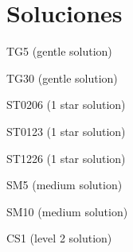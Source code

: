 \documentclass[10pt,letterpaper]{article}
\author{Germ\'{a}n Avendaño Ram\'{i}rez}
\begin{document}
\cluefont{\normalsize}
\section*{Soluciones}

\noindent\begin{minipage}{0.47\linewidth}\begin{center}
TG5 (gentle solution) \\
\end{center}\end{minipage}\hfill
\begin{minipage}{0.47\linewidth}\begin{center}
TG30 (gentle solution) \\
\end{center}\end{minipage}
\vspace*{12pt}

\begin{minipage}{0.47\linewidth}\begin{center}
ST0206 (1 star solution) \\
\end{center}\end{minipage}\hfill
\noindent\begin{minipage}{0.47\linewidth}\begin{center}
ST0123 (1 star solution) \\
\end{center}\end{minipage}
\vspace*{12pt}

\begin{minipage}{0.47\linewidth}\begin{center}
ST1226 (1 star solution) \\
\end{center}\end{minipage}\hfill
\noindent\begin{minipage}{0.47\linewidth}\begin{center}
SM5 (medium solution) \\
\end{center}\end{minipage}
\vspace*{12pt}

\begin{minipage}{0.47\linewidth}\begin{center}
SM10 (medium solution) \\
\end{center}\end{minipage}\hfill
\begin{minipage}{0.47\linewidth}\begin{center}
CS1 (level 2 solution) \\
\end{center}\end{minipage}
\vspace*{12pt}
\end{document}
